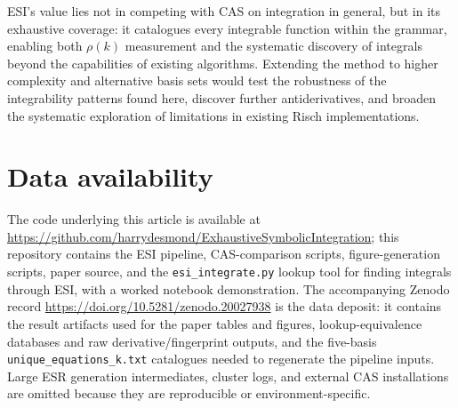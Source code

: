 \documentclass[preprint,12pt,authoryear]{elsarticle}
\newcommand{\rhok}{\rho(k)}
\newcommand{\codexadd}[1]{{\color{purple}#1}}
\newcommand{\hd}[1]{{\color{red}\textbf{[HD: #1]}}}
\begin{document}
\codexadd{ESI's value lies not in competing with CAS on integration in general, but in its exhaustive coverage: it catalogues every integrable function within the grammar, enabling both $\rhok$ measurement and the systematic discovery of integrals beyond the capabilities of existing algorithms. Extending the method to higher complexity and alternative basis sets would test the robustness of the integrability patterns found here, discover further antiderivatives, and broaden the systematic exploration of limitations in existing Risch implementations.}

\section*{Data availability}

\codexadd{The code underlying this article is available at \url{https://github.com/harrydesmond/ExhaustiveSymbolicIntegration}; this repository contains the ESI pipeline, CAS-comparison scripts, figure-generation scripts, paper source, and the \texttt{esi\_integrate.py} lookup tool for finding integrals through ESI, with a worked notebook demonstration. The accompanying Zenodo record \url{https://doi.org/10.5281/zenodo.20027938} is the data deposit: it contains the result artifacts used for the paper tables and figures, lookup-equivalence databases and raw derivative/fingerprint outputs, and the five-basis \texttt{unique\_equations\_k.txt} catalogues needed to regenerate the pipeline inputs. Large ESR generation intermediates, cluster logs, and external CAS installations are omitted because they are reproducible or environment-specific.}
\end{document}
